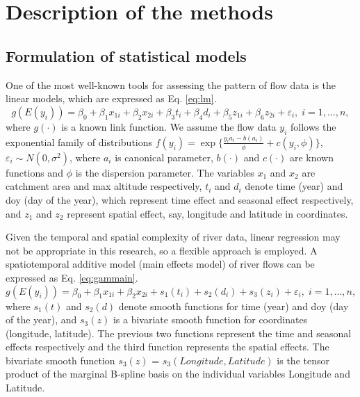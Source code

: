 \documentclass[12pt,oneside]{reedthesis}
\begin{document}
\hypertarget{ref-labels}{%
\chapter{Description of the methods}\label{ref-labels}}

\hypertarget{formulation-of-statistical-models}{%
\section{Formulation of statistical models}\label{formulation-of-statistical-models}}

One of the most well-known tools for assessing the pattern of flow data is the linear models, which are expressed as Eq. \ref{eq:lm}.
\begin{equation}
g(E(y_i))=\beta_0+\beta_1 x_{1i}+\beta_2 x_{2i} + \beta_3 t_i + \beta_4 d_i + \beta_5z_{1i}+\beta_6z_{2i}+\varepsilon_i,\;i=1,\dots,n, \label{eq:lm}
\end{equation}
where \(g(\cdot)\) is a known link function. We assume the flow data \(y_{i}\) follows the exponential family of distributions \(f(y_{i})=\exp\{\frac{y_{i}a_{i}-b(a_{i})}{\phi}+c(y_{i},\phi)\}\), \(\varepsilon_i\sim N(0,\sigma^2)\), where \(a_{i}\) is canonical parameter, \(b(\cdot)\) and \(c(\cdot)\) are known functions and \(\phi\) is the dispersion parameter. The variables \(x_1\) and \(x_2\) are catchment area and max altitude respectively, \(t_i\) and \(d_i\) denote time (year) and doy (day of the year), which represent time effect and seasonal effect respectively, and \(z_1\) and \(z_2\) represent spatial effect, say, longitude and latitude in coordinates.

Given the temporal and spatial complexity of river data, linear regression may not be appropriate in this research, so a flexible approach is employed. A spatiotemporal additive model (main effects model) of river flows can be expressed as Eq. \ref{eq:gammain}.
\begin{equation}
g(E(y_i)) =\beta_0+\beta_1 x_{1i}+\beta_2 x_{2i}+s_1(t_i) + s_2(d_i) + s_3(z_i)+\varepsilon_i,\;i=1,\dots,n, \label{eq:gammain}
\end{equation}
where \(s_1(t)\) and \(s_2(d)\) denote smooth functions for time (year) and doy (day of the year), and \(s_3(z)\) is a bivariate smooth function for coordinates (longitude, latitude). The previous two functions represent the time and seasonal effects respectively and the third function represents the spatial effects. The bivariate smooth function \(s_3(z)\) = \(s_3(Longitude, Latitude)\) is the tensor product of the marginal B-spline basis on the individual variables Longitude and Latitude.
\end{document}
